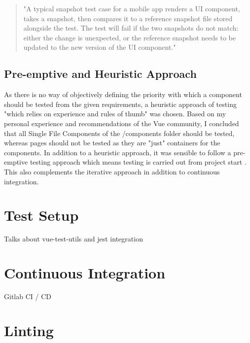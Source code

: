 \begin{quotation}
"A typical snapshot test case for a mobile app renders a UI component, takes a snapshot, then compares it to a reference snapshot file stored alongside the test. The test will fail if the two snapshots do not match: either the change is unexpected, or the reference snapshot needs to be updated to the new version of the UI component."
\end{quotation}

\subsection{Pre-emptive and Heuristic Approach} \label{preheur}
As there is no way of objectively defining the priority with which a component should be tested from the given requirements, a heuristic approach of testing "which relies on experience and rules of thumb" \cite{spillner2014software} was chosen. Based on my personal experience and recommendations of the Vue community, I concluded that all Single File Components of the /components folder should be tested, whereas pages should not be tested as they are "just" containers for the components. In addition to a heuristic approach, it was sensible to follow a pre-emptive testing approach which means testing is carried out from project start \cite{spillner2014software}. This also complements the iterative approach in addition to continuous integration. 


\section{Test Setup}
Talks about vue-test-utils and jest integration

\section{Continuous Integration}
Gitlab CI / CD

\section{Linting}